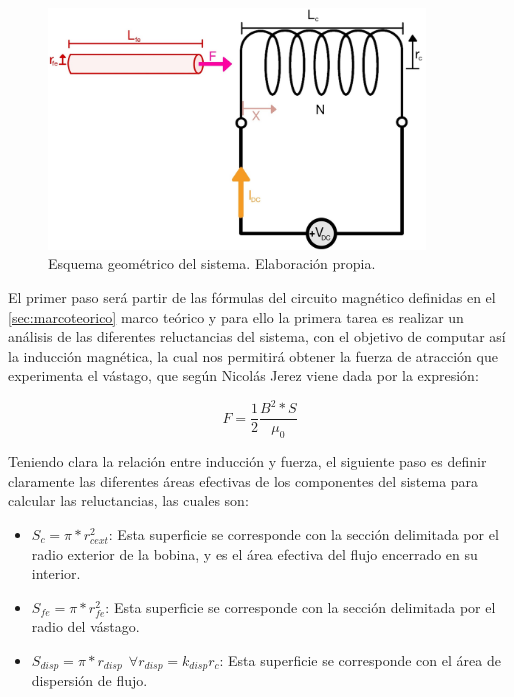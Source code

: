 \begin{figure}[H]
    \centering
    \includegraphics[width=10cm]{FigurasMemoria/esquemaDesTeor.jpg}
    \caption{Esquema geométrico del sistema. Elaboración propia.}
    \label{fig:esquemaDesTeor} %
\end{figure}

El primer paso será partir de las fórmulas del circuito magnético definidas en el \ref{sec:marcoteorico} marco teórico y para ello la primera tarea es realizar un análisis de las diferentes reluctancias del sistema, con el objetivo de computar así la inducción magnética, la cual nos permitirá obtener la fuerza de atracción que experimenta el vástago, que según Nicolás Jerez \citep{jerez2016resueltos} viene dada por la expresión:

\begin{center}
\[F=\frac{1}{2}\frac{B^2*S}{\mu_0}\]
\end{center}

Teniendo clara la relación entre inducción y fuerza, el siguiente paso es definir claramente las diferentes áreas efectivas de los componentes del sistema para calcular las reluctancias, las cuales son:

\begin{itemize}
    \item \(S_{c}=\pi *r_{cext}^2\): Esta superficie se corresponde con la sección delimitada por el radio exterior de la bobina, y es el área efectiva del flujo encerrado en su interior.
    \item \(S_{fe}=\pi *r_{fe}^2\): Esta superficie se corresponde con la sección delimitada por el radio del vástago.
    \item \(S_{disp}=\pi *r_{disp}~~\forall r_{disp} = k_{disp}r_c\): Esta superficie se corresponde con el área de dispersión de flujo.
\end{itemize}

